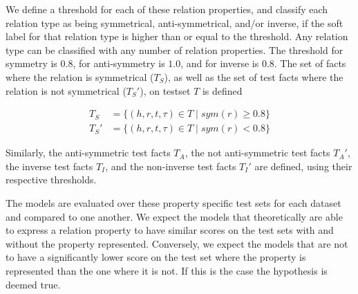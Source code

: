 We define a threshold for each of these relation properties, and classify each relation type as being symmetrical, anti-symmetrical, and/or inverse, if the soft label for that relation type is higher than or equal to the threshold. Any relation type can be classified with any number of relation properties. The threshold for symmetry is $0.8$, for anti-symmetry is $1.0$, and for inverse is $0.8$.
The set of facts where the relation is symmetrical ($T_S$), as well as the set of test facts where the relation is not symmetrical ($T_S'$), on testset $T$ is defined

\begin{equation}
\begin{aligned}
T_S & = \{ (h, r, t, \tau) \in T \mid \mathit{sym}(r) \geq 0.8 \}\\
T_S' & = \{ (h, r, t, \tau) \in T \mid \mathit{sym}(r) < 0.8 \}
\end{aligned}
\end{equation}

\noindent
Similarly, the anti-symmetric test facts $T_A$, the not anti-symmetric test facts $T_A'$, the inverse test facts $T_I$, and the non-inverse test facts $T_I'$ are defined, using their respective thresholds.

The models are evaluated over these property specific test sets for each dataset and compared to one another. 
We expect the models that theoretically are able to express a relation property to have similar scores on the test sets with and without the property represented.
Conversely, we expect the models that are not to have a significantly lower score on the test set where the property is represented than the one where it is not.
If this is the case the hypothesis is deemed true.